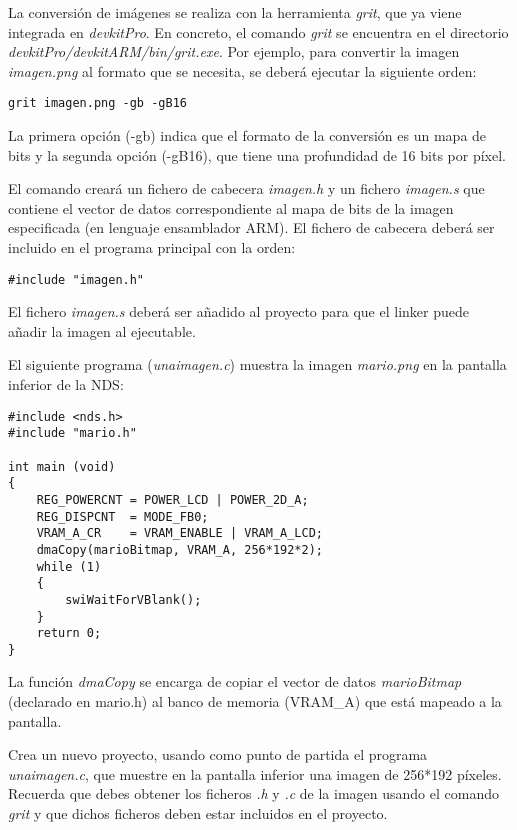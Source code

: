 La conversión de imágenes se realiza con la herramienta \textit{grit}, que ya viene integrada en \textit{devkitPro}. En concreto, el comando \textit{grit} se encuentra en el directorio \textit{devkitPro/devkitARM/bin/grit.exe}. Por ejemplo, para convertir la imagen \textit{imagen.png} al formato que se necesita, se deberá ejecutar la siguiente orden:

\begin{verbatim}
grit imagen.png -gb -gB16
\end{verbatim}

La primera opción (-gb) indica que el formato de la conversión es un mapa de bits y la segunda opción (-gB16), que tiene una profundidad de 16 bits por píxel.

El comando creará un fichero de cabecera \textit{imagen.h} y un fichero \textit{imagen.s} que contiene el vector de datos correspondiente al mapa de bits de la imagen especificada (en lenguaje ensamblador ARM). El fichero de cabecera deberá ser incluido en el programa principal con la orden:

\begin{verbatim}
#include "imagen.h"
\end{verbatim}
	
El fichero \textit{imagen.s} deberá ser añadido al proyecto para que el linker puede añadir la imagen al ejecutable.

\begin{example}
El siguiente programa (\textit{unaimagen.c}) muestra la imagen \textit{mario.png} en la pantalla inferior de la NDS:

\begin{lstlisting}
#include <nds.h>
#include "mario.h"

int main (void)
{
	REG_POWERCNT = POWER_LCD | POWER_2D_A;
	REG_DISPCNT  = MODE_FB0;
	VRAM_A_CR    = VRAM_ENABLE | VRAM_A_LCD;
	dmaCopy(marioBitmap, VRAM_A, 256*192*2);
	while (1)
	{
		swiWaitForVBlank();
	}
	return 0;
}
\end{lstlisting}
\end{example}

La función \textit{dmaCopy} se encarga de copiar el vector de datos \textit{marioBitmap} (declarado en mario.h) al banco de memoria (VRAM\_A) que está mapeado a la pantalla.

\begin{exercise}
Crea un nuevo proyecto, usando como punto de partida el programa \textit{unaimagen.c}, que muestre en la pantalla inferior una imagen de 256*192 píxeles. Recuerda que debes obtener los ficheros \textit{.h} y \textit{.c} de la imagen usando el comando \textit{grit} y que dichos ficheros deben estar incluidos en el proyecto.
\end{exercise}


